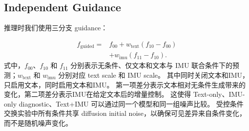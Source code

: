 \subsection{Independent Guidance}

推理时我们使用三分支 guidance：

\begin{equation}\begin{split}f_{\mathrm{guided}}={}&f_{00}+w_{\mathrm{text}}(f_{10}-f_{00})\\ &+w_{\mathrm{imu}}(f_{11}-f_{10}).\end{split}\end{equation}
式中，$f_{00}$、$f_{10}$ 和 $f_{11}$ 分别表示无条件、仅文本和文本与 IMU 联合条件下的预测；$w_{\mathrm{text}}$ 和 $w_{\mathrm{imu}}$ 分别对应 text scale 和 IMU scale。
其中\texttt{}同时关闭文本和IMU，\texttt{}只启用文本，\texttt{}同时启用文本和IMU。
第一项差分表示文本相对无条件生成带来的变化，第二项差分表示IMU在给定文本后的增量控制。
这使得 Text-only、IMU-only diagnostic、Text+IMU 可以通过同一个模型和同一组噪声比较。
受控条件交换实验中所有条件共享 diffusion initial noise，以确保可见差异来自条件变化，而不是随机噪声变化。
